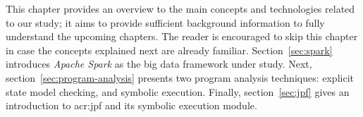 \label{ch:relatedwork}

This chapter provides an overview to the main concepts and technologies related to our study; it aims to provide sufficient background information to fully understand the upcoming chapters. The reader is encouraged to skip this chapter in case the concepts explained next are already familiar. Section~\ref{sec:spark} introduces \textit{Apache Spark} as the big data framework under study. Next, section~\ref{sec:program-analysis} presents two program analysis techniques: explicit state model checking, and symbolic execution. Finally, section~\ref{sec:jpf} gives an introduction to \acrfull{acr:jpf} and its symbolic execution module.




